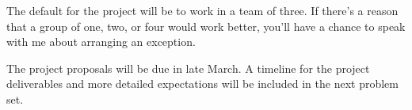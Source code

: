 \documentclass[12pt,letterpaper,answers]{exam}
\begin{document}
\begin{questions}
The default for the project will be to work in a team of three.  If there's a reason that a group of one, two, or four would work better, you'll have a chance to speak with me about arranging an exception. 

The project proposals will be due in late March. %
A timeline for the project deliverables and more detailed expectations will be included in the next problem set.


\nocite{*}



    

\end{questions}
\end{document}
